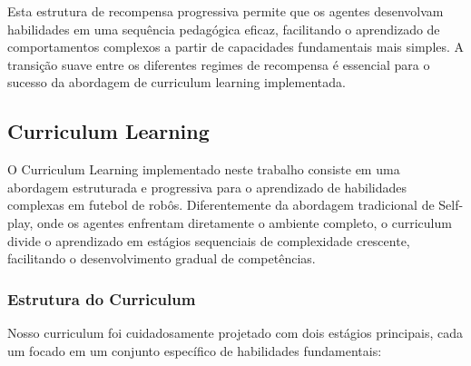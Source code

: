 Esta estrutura de recompensa progressiva permite que os agentes desenvolvam habilidades em uma sequência pedagógica eficaz, facilitando o aprendizado de comportamentos complexos a partir de capacidades fundamentais mais simples. A transição suave entre os diferentes regimes de recompensa é essencial para o sucesso da abordagem de curriculum learning implementada.

\subsection{Curriculum Learning}

O Curriculum Learning implementado neste trabalho consiste em uma abordagem estruturada e progressiva para o aprendizado de habilidades complexas em futebol de robôs. Diferentemente da abordagem tradicional de Self-play, onde os agentes enfrentam diretamente o ambiente completo, o curriculum divide o aprendizado em estágios sequenciais de complexidade crescente, facilitando o desenvolvimento gradual de competências.

\subsubsection{Estrutura do Curriculum}

Nosso curriculum foi cuidadosamente projetado com dois estágios principais, cada um focado em um conjunto específico de habilidades fundamentais:

